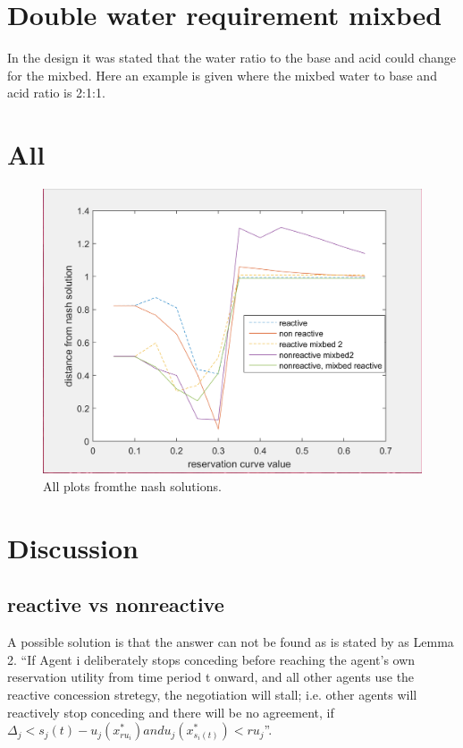 \section{Double water requirement mixbed}
In the design it was stated that the water ratio to the base and acid could change for the mixbed. Here an example is given where the mixbed water to base and acid ratio is 2:1:1. 


\section{All}


\begin{figure}
	\centering
	\includegraphics[width=0.7\linewidth]{img/all_dist_from_nash_solutions}
	\caption{All plots fromthe nash solutions.}
	\label{fig:alldistfromnashsolutions}
\end{figure}






\section{Discussion}
\subsection{reactive vs nonreactive}
A possible solution is that the answer can not be found as is stated by \citet{zheng2015automated} as Lemma 2. ``If Agent i deliberately stops conceding before reaching the agent's own reservation utility from time period t onward, and all other agents use the reactive concession stretegy, the negotiation will stall; i.e. other agents will reactively stop conceding and there will be no agreement, if $\Delta_j < s_j(t)-u_j(x^*_{ru_i}) and u_j(x^*_{s_i(t)})<ru_j$''.

